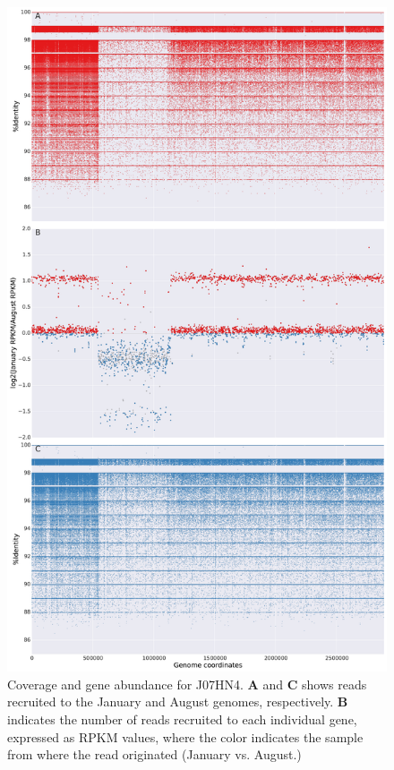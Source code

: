 \begin{figure}[!hbtp]
  \centering
  \includegraphics[width=\textwidth,height=0.8\textheight,keepaspectratio]{Chapter5/Figures/coverage_plots/J07HN4_coverage.pdf}
  \caption{Coverage and gene abundance for J07HN4. \textbf{A} and \textbf{C} shows reads recruited to the January and August genomes, respectively. \textbf{B} indicates the number of reads recruited to each individual gene, expressed as RPKM values, where the color indicates the sample from where the read originated (January vs. August.)}
  \label{J07HN4coverage}
\end{figure}

